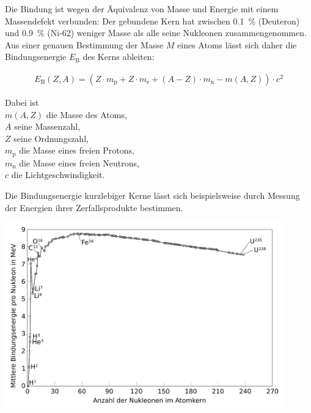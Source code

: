 \documentclass[12pt,a4paper,twoside]{article}
\begin{document}
Die Bindung ist wegen der Äquivalenz von Masse und Energie mit einem Massendefekt verbunden: Der gebundene Kern hat zwischen \SI{0,1}{\percent} (Deuteron)
und \SI{0,9}{\percent} (Ni-62) weniger Masse als alle seine Nukleonen zusammengenommen. Aus einer genauen Bestimmung der Masse $M$ eines Atoms 
lässt sich daher die Bindungsenergie $E_{\text{B}}$ des Kerns ableiten:

\begin{eqnarray*}
    E_{\text{B}}(Z,A) = \left(Z \cdot m_{\text{p}} + Z \cdot m_{\text{e}} + (A - Z) \cdot m_{\text{n}} - m(A,Z)\right) \cdot c^2
\end{eqnarray*}

Dabei ist\\
	$m(A,Z)$ die Masse des Atoms,\\
	$A$ seine Massenzahl,\\
	$Z$ seine Ordnungszahl,\\
	$m_{\text{p}}$ die Masse eines freien Protons,\\
	$m_{\text{n}}$ die Masse eines freien Neutrons,\\
	$c$ die Lichtgeschwindigkeit.

Die Bindungsenergie kurzlebiger Kerne lässt sich beispielsweise durch Messung der Energien ihrer Zerfallsprodukte bestimmen.

\begin{center}
	\includegraphics[width=0.90\textwidth]{./Binding_energy_curve_-_common_isotopes_DE.pdf}
\end{center}


\newpage
\end{document}
